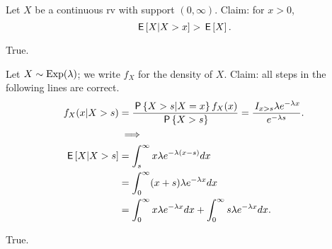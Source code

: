 \documentclass[tf-tutorial-all.tex]{subfiles}
\begin{document}
\begin{truefalse}
Let $X$ be a continuous rv with support $(0, \infty)$. Claim: for $x>0$,
\begin{equation}
\label{eq:6}
\,\mathsf{E}\left[X|X>x\right]>\,\mathsf{E}\left[X\right].
\end{equation}
\begin{solution}
True.
\end{solution}
\end{truefalse}

\begin{truefalse}
Let $X \sim \mathrm{Exp}(\lambda)$; we write $f_{X}$ for the density of $X$.
Claim:  all steps in the following lines are correct.
\begin{align*}
 f_{X}(x|X>s) &= \frac{\,\mathsf{P}\left\{X>s|X=x\right\}f_{X}(x)}{\,\mathsf{P}\left\{X>s\right\}} = \frac{ \,I_{x > s} \lambda e^{-\lambda x}}{e^{-\lambda s}}. \\
&  \implies \\
    \,\mathsf{E}\left[X|X>s\right] &= \int^{\infty}_{s} x \lambda e^{-\lambda(x-s)} dx\\
    &= \int^{\infty}_{0}(x + s) \lambda e^{-\lambda x} dx \\
    &= \int^{\infty}_{0}x  \lambda e^{-\lambda x} dx + \int^{\infty}_{0} s \lambda e^{-\lambda x} dx.
\end{align*}
\begin{solution}
True.
\end{solution}
\end{truefalse}
\end{document}

